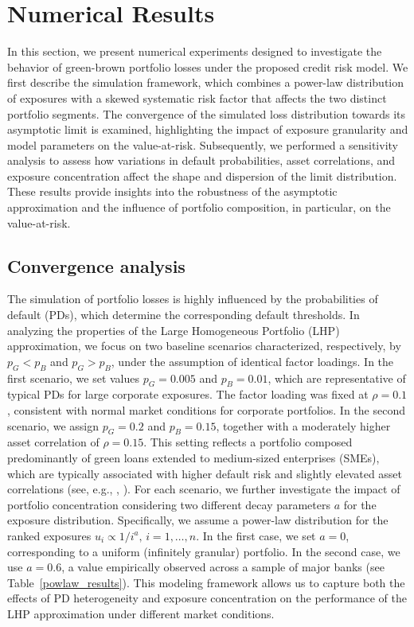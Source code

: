 \documentclass[preprint,12pt]{article}
\begin{document}
\section{Numerical Results}
In this section, we present numerical experiments designed to investigate the behavior of green-brown portfolio losses under the proposed credit risk model. We first describe the simulation framework, which combines a power-law distribution of exposures with a skewed systematic risk factor that affects the two distinct portfolio segments. The convergence of the simulated loss distribution towards its asymptotic limit is examined, highlighting the impact of exposure granularity and model parameters on the value-at-risk. Subsequently, we performed a sensitivity analysis to assess how variations in default probabilities, asset correlations, and exposure concentration affect the shape and dispersion of the limit distribution. These results provide insights into the robustness of the asymptotic approximation and the influence of portfolio composition, in particular, on the value-at-risk.

\subsection{Convergence analysis}

The simulation of portfolio losses is highly influenced by the probabilities of default (PDs), which determine the corresponding default thresholds. In analyzing the properties of the Large Homogeneous Portfolio (LHP) approximation, we focus on two baseline scenarios characterized, respectively, by $ p_G < p_B$ and $ p_G > p_B$, under the assumption of identical factor loadings.
In the first scenario, we set values $p_G = 0.005$ and $p_B = 0.01$, which are representative of typical PDs for large corporate exposures. The factor loading was fixed at $\rho = 0.1$, consistent with normal market conditions for corporate portfolios. 
In the second scenario, we assign $p_G = 0.2$ and $p_B = 0.15$, together with a moderately higher asset correlation of $\rho = 0.15$. This setting reflects a portfolio composed predominantly of green loans extended to medium-sized enterprises (SMEs), which are typically associated with higher default risk and slightly elevated asset correlations (see, e.g., \cite{EBA2024}, \cite{EBACasel2023}).
For each scenario, we further investigate the impact of portfolio concentration considering two different decay parameters $a$ for the exposure distribution. Specifically, we assume a power-law distribution for the ranked exposures $u_i \propto 1/i^{a}, \, i = 1, \ldots, n $. In the first case, we set $a = 0$, corresponding to a uniform (infinitely granular) portfolio. In the second case, we use $a = 0.6$, a value empirically observed across a sample of major banks (see Table~\ref{powlaw_results}).
This modeling framework allows us to capture both the effects of PD heterogeneity and exposure concentration on the performance of the LHP approximation under different market conditions.
\end{document}
